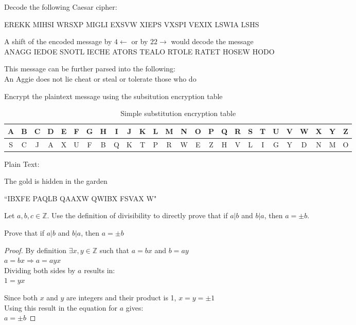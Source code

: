 \documentclass[12pt]{article}
\begin{document}
\thispagestyle{empty}
\problem Decode the following Caesar cipher:
\begin{center}
EREKK MIHSI WRSXP MIGLI EXSVW XIEPS VXSPI VEXIX LSWIA LSHS
\end{center}

\solution
A shift of the encoded message by $4\leftarrow$ or by $22\rightarrow$ would decode the message\\
ANAGG IEDOE SNOTL IECHE ATORS TEALO RTOLE RATET HOSEW HODO

\noindent
This message can be further parsed into the following:\\
An Aggie does not lie cheat or steal or tolerate those who do

\problem Encrypt the plaintext message using the subsitution encryption table
\begin{table}[!ht]
    \centering
    \begin{tabular}{|c|c|c|c|c|c|c|c|c|c|c|c|c|c|c|c|c|c|c|c|c|c|c|c|c|c|}
        \hline
        A & B & C & D & E & F & G & H & I & J & K & L & M & N & O & P & Q & R & S & T & U & V & W & X & Y & Z \\
        \hline
        S & C & J & A & X & U & F & B & Q & K & T & P & R & W & E & Z & H & V & L & I & G & Y & D & N & M & O \\
        \hline
    \end{tabular}
    \caption{Simple substitution encryption table}
\end{table}

\noindent
Plain Text:
\begin{center}
The gold is hidden in the garden
\end{center}

\solution
``IBXFE PAQLB QAAXW QWIBX FSVAX W"

\newpage
\problem Let $a,b,c\in\mathbb{Z}$. Use the definition of divisibility to directly prove that if $a|b$ and $b|a$, then $a=\pm b$.

\solution 
Prove that if $a|b$ and $b|a$, then $a=\pm b$
\begin{proof}
By definition $\exists x,y\in\mathbb{Z}$ such that $a=bx$ and $b=ay$\\
$a = bx \Rightarrow a = ayx$\\
Dividing both sides by $a$ results in:\\
$1 = yx$

\noindent
Since both $x$ and $y$ are integers and their product is 1, $x=y=\pm 1$\\
Using this result in the equation for $a$ gives:\\
$a=\pm b$
\end{proof}
\end{document}
